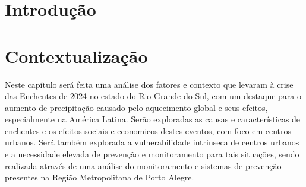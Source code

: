 \documentclass[
	12pt,				%
	openright,			%
	twoside,			%
	a4paper,			%
	english,			%
	french,				%
	spanish,			%
  japanese,
	brazil				%
	]{abntex2}
\begin{document}

\tableofcontents*
\cleardoublepage

\textual

\chapter{Introdução}



\chapter{Contextualização}
Neste capítulo será feita uma análise dos fatores e contexto que levaram à crise das Enchentes de 2024 no estado do Rio
Grande do Sul, com um destaque para o aumento de precipitação causado pelo aquecimento global e seus efeitos,
especialmente na América Latina. Serão exploradas as causas e características de enchentes e os efeitos sociais e
economicos destes eventos, com foco em centros urbanos. Será também explorada a vulnerabilidade intrinseca de centros
urbanos e a necessidade elevada de prevenção e monitoramento para tais situações, sendo realizada através de uma análise
do monitoramento e sistemas de prevenção presentes na Região Metropolitana de Porto Alegre.
\end{document}
